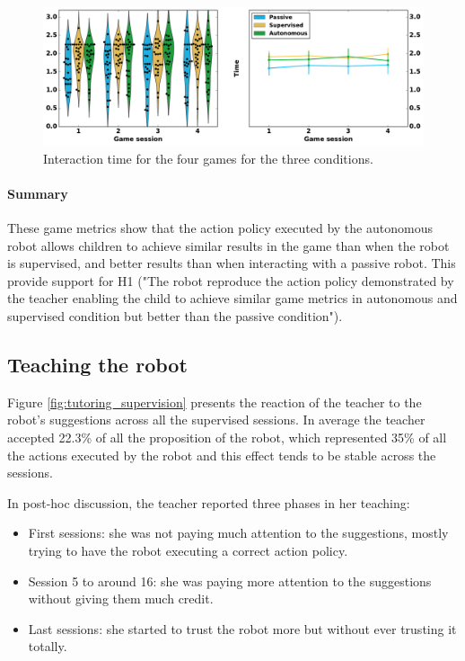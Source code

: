 \begin{figure}[ht]
	\includegraphics[width=1\linewidth]{time.pdf}
	\centering
	\caption{Interaction time for the four games for the three conditions.}
	\label{fig:tutoring_time}
\end{figure}


\paragraph{Summary}

These game metrics show that the action policy executed by the autonomous robot allows children to achieve similar results in the game than when the robot is supervised, and better results than when interacting with a passive robot. This provide support for H1 ("The robot reproduce the action policy demonstrated by the teacher enabling the child to achieve similar game metrics in autonomous and supervised condition but better than the passive condition"). 

\subsection{Teaching the robot}
Figure \ref{fig:tutoring_supervision} presents the reaction of the teacher to the robot's suggestions across all the supervised sessions. In average the teacher accepted 22.3\% of all the proposition of the robot, which represented 35\% of all the actions executed by the robot and this effect tends to be stable across the sessions.

In post-hoc discussion, the teacher reported three phases in her teaching: 
\begin{itemize}
	\item First sessions: she was not paying much attention to the suggestions, mostly trying to have the robot executing a correct action policy.
	\item Session 5 to around 16: she was paying more attention to the suggestions without giving them much credit.
	\item Last sessions: she started to trust the robot more but without ever trusting it totally.
\end{itemize}

